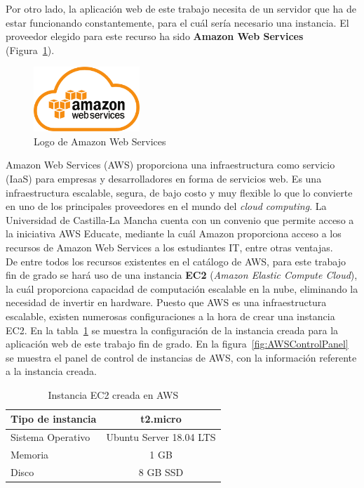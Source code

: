 Por otro lado, la aplicación web de este trabajo necesita de un servidor que ha de estar funcionando constantemente, para el cuál sería necesario una instancia. El proveedor elegido para este recurso ha sido \textbf{Amazon Web Services}~\cite{AWS} (Figura~\ref{fig:AWS}).
\begin{figure}[H]
            \centering
            \includegraphics[width=4cm]{figs/aws_logo.png}
            \caption{Logo de Amazon Web Services}
            \label{fig:AWS}
\end{figure}

Amazon Web Services (AWS) proporciona una infraestructura como servicio (IaaS) para empresas y desarrolladores en forma de servicios web. Es una infraestructura escalable, segura, de bajo costo y muy flexible lo que lo convierte en uno de los principales proveedores en el mundo del \textit{cloud computing}. La Universidad de Castilla-La Mancha cuenta con un convenio que permite acceso a la iniciativa AWS Educate, mediante la cuál Amazon proporciona acceso a los recursos de Amazon Web Services a los estudiantes IT, entre otras ventajas.\\
De entre todos los recursos existentes en el catálogo de AWS, para este trabajo fin de grado se hará uso de una instancia \textbf{EC2} (\textit{Amazon Elastic Compute Cloud}), la cuál proporciona capacidad de computación escalable en la nube, eliminando la necesidad de invertir en hardware. Puesto que AWS es una infraestructura escalable, existen numerosas configuraciones a la hora de crear una instancia EC2. En la tabla~\ref{tab:EC2instance} se muestra la configuración de la instancia creada para la aplicación web de este trabajo fin de grado. En la figura~\ref{fig:AWSControlPanel} se muestra el panel de control de instancias de AWS, con la información referente a la instancia creada.
\begin{table}[hp]
        \centering
        \begin{tabular}{|l|c|}
                \hline
                Tipo de instancia & t2.micro \\ \hline
                Sistema Operativo & Ubuntu Server 18.04 LTS \\ \hline
                Memoria & 1 GB \\ \hline
                Disco & 8 GB SSD \\ \hline
             \end{tabular}
        \caption{Instancia EC2 creada en AWS}
        \label{tab:EC2instance}
\end{table}

